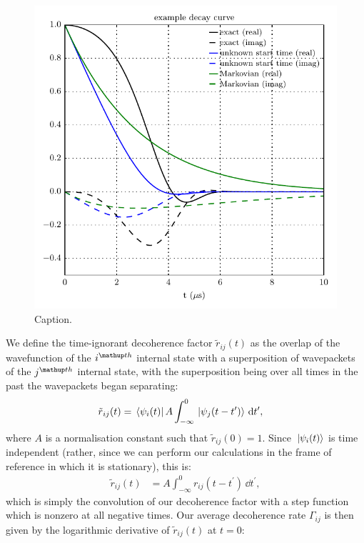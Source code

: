 \begin{figure}[t]
    \centerfloat
    \includegraphics{figures/hidden_variables/decoherence_factor_example.pdf}
    \caption{Caption.}
    \label{fig:decoherence_factor_example}
\end{figure}

We define the time-ignorant decoherence factor $\tilde r_{ij}(t)$ as the overlap of the wavefunction of the $i^\up{th}$ internal state with a superposition of wavepackets of the $j^\up{th}$ internal state, with the superposition being over all times in the past the wavepackets began separating:
\begin{align}
\tilde r_{ij}(t) &= \bra{\psi_i(t)} A\int_{-\infty}^0 \ket{\psi_j(t - t^\prime)} \,\dd t^\prime,
\end{align}
where $A$ is a normalisation constant such that $\tilde r_{ij}(0) = 1$.
Since $\ket{\psi_i(t)}$ is time independent (rather, since we can perform our calculations in the frame of reference in which it is stationary), this is:
\begin{align}
\tilde r_{ij}(t) &= A\int_{-\infty}^0 r_{ij}(t - t^\prime) \,\dd t^\prime,
\end{align}
which is simply the convolution of our decoherence factor with a step function which is nonzero at all negative times.
Our average decoherence rate $\Gamma_{ij}$ is then given by the logarithmic derivative of $\tilde r_{ij}(t)$ at $t=0$:

